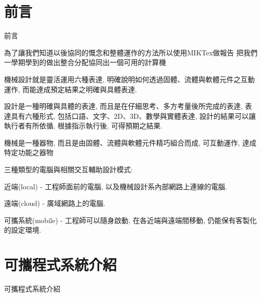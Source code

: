 \documentclass[12pt,,]{report}
\begin{document}
\begingroup
    \renewcommand{\contentsname}{\center 目錄 \addcontentsline{toc}{chapter}{目錄}}
    \renewcommand{\numberline}[1]{~#1\hspace*{1em}}
        \setcounter{tocdepth}{2}
    \tableofcontents
    \newcommand{\lotlabel}{表}
    \renewcommand{\listtablename}{\center 表目錄 \addcontentsline{toc}{chapter}{表目錄}}
    \renewcommand{\numberline}[1]{\lotlabel~#1\hspace*{1em}}
    \listoftables
    \newcommand{\loflabel}{圖}
    \renewcommand{\listfigurename}{\center 圖目錄 \addcontentsline{toc}{chapter}{圖目錄}}
    \renewcommand{\numberline}[1]{\loflabel~#1\hspace*{1em}}
    \listoffigures
\endgroup

\mainmatter
\hypertarget{ux524dux8a00}{%
\chapter{前言}\label{ux524dux8a00}}

前言

為了讓我們知道以後協同的慨念和整體運作的方法所以使用MIKTex做報告
把我們一學期學到的做出整合分配協同出一個可用的計算機

機械設計就是靈活運用六種表達,
明確說明如何透過固體、流體與軟體元件之互動運作,
而能達成預定結果之明確與具體表達.

設計是一種明確與具體的表達, 而且是在仔細思考、多方考量後所完成的表達,
表達具有六種形式, 包括口語、文字、2D、3D、數學與實體表達,
設計的結果可以讓執行者有所依循, 根據指示執行後, 可得預期之結果.

機械是一種器物, 而且是由固體、流體與軟體元件精巧組合而成, 可互動運作,
達成特定功能之器物

三種類型的電腦與相關交互輔助設計模式:

近端(local) - 工程師面前的電腦, 以及機械設計系內部網路上連線的電腦.

遠端(cloud) - 廣域網路上的電腦.

可攜系統(mobile) - 工程師可以隨身啟動, 在各近端與遠端間移動,
仍能保有客製化的設定環境.

\hypertarget{ux53efux651cux7a0bux5f0fux7cfbux7d71ux4ecbux7d39}{%
\chapter{可攜程式系統介紹}\label{ux53efux651cux7a0bux5f0fux7cfbux7d71ux4ecbux7d39}}

可攜程式系統介紹
\end{document}
